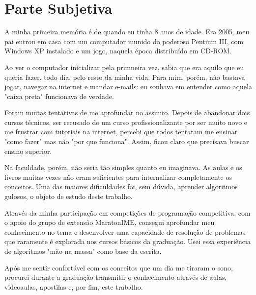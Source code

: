 \chapter{Parte Subjetiva}
\label{subjetiva}


A minha primeira memória é de quando eu tinha 8 anos de idade. Era 2005, meu pai entrou em casa com um computador munido do poderoso Pentium III, com Windows XP instalado e um jogo, naquela época distribuído em CD-ROM.

Ao ver o computador inicializar pela primneira vez, sabia que era aquilo que eu queria fazer, todo dia, pelo resto da minha vida. Para mim, porém, não bastava jogar, navegar na internet e mandar e-mails: eu sonhava em entender como aquela "caixa preta" funcionava de verdade.

Foram muitas tentativas de me aprofundar no assunto. Depois de abandonar dois cursos técnicos, ser recusado de um curso profissionalizante por ser muito novo e me frustrar com tutoriais na internet, percebi que todos tentaram me ensinar "como fazer" mas não "por que funciona". Assim, ficou claro que precisava buscar ensino superior.

Na faculdade, porém, não seria tão simples quanto eu imaginava. As aulas e os livros muitas vezes não eram suficientes para internalizar completamente os conceitos. Uma das maiores dificuldades foi, sem dúvida, aprender algoritmos gulosos, o objeto de estudo deste trabalho.

Através da minha participação em competições de programação competitiva, com o apoio do grupo de extensão MaratonIME, consegui aprofundar meu conhecimento no tema e desenvolver uma capacidade de resolução de problemas que raramente é explorada nos cursos básicos da graduação. Usei essa experiência de algoritmos "mão na massa" como base da escrita.  

Após me sentir confortável com os conceitos que um dia me tiraram o sono, procurei durante a graduação transmitir o conhecimento através de aulas, videoaulas, apostilas e, por fim, este trabalho.